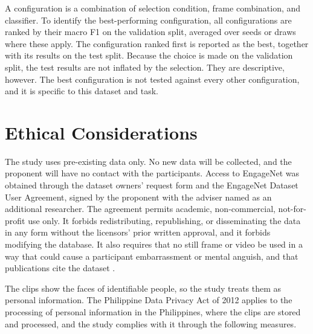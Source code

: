 A configuration is a combination of selection condition, frame combination, and classifier. To identify the best-performing configuration, all configurations are ranked by their macro F1 on the validation split, averaged over seeds or draws where these apply. The configuration ranked first is reported as the best, together with its results on the test split. Because the choice is made on the validation split, the test results are not inflated by the selection. They are descriptive, however. The best configuration is not tested against every other configuration, and it is specific to this dataset and task.



\section{Ethical Considerations}
\label{sec:ethics}

The study uses pre-existing data only. No new data will be collected, and the proponent will have no contact with the participants. Access to EngageNet was obtained through the dataset owners' request form and the EngageNet Dataset User Agreement, signed by the proponent with the adviser named as an additional researcher. The agreement permits academic, non-commercial, not-for-profit use only. It forbids redistributing, republishing, or disseminating the data in any form without the licensors' prior written approval, and it forbids modifying the database. It also requires that no still frame or video be used in a way that could cause a participant embarrassment or mental anguish, and that publications cite the dataset \cite{singh2023}.

The clips show the faces of identifiable people, so the study treats them as personal information. The Philippine Data Privacy Act of 2012 \cite{ra10173} applies to the processing of personal information in the Philippines, where the clips are stored and processed, and the study complies with it through the following measures.

